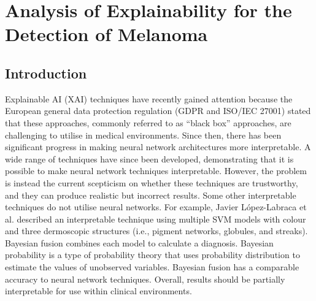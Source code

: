\chapter{Analysis of Explainability for the Detection of Melanoma}

\section{Introduction}
Explainable AI (XAI) techniques have recently gained attention because the European general data protection regulation (GDPR and ISO/IEC 27001) stated that these approaches, commonly referred to as ``black box'' approaches, are challenging to utilise in medical environments. Since then, there has been significant progress in making neural network architectures more interpretable. A wide range of techniques\cite{Fuji2019,  Selvaraju2016, Ribeiro2016} have since been developed, demonstrating that it is possible to make neural network techniques interpretable. However, the problem is instead the current scepticism on whether these techniques are trustworthy\cite{Tjoa2019, Samek2019a}, and they can produce realistic but incorrect results\cite{Ghorbani2019}. Some other interpretable techniques do not utilise neural networks. For example, Javier López-Labraca et al.\cite{Lopez-Labraca2018} described an interpretable technique using multiple SVM models with colour and three dermoscopic structures (i.e., pigment networks, globules, and streaks). Bayesian fusion combines each model to calculate a diagnosis. Bayesian probability is a type of probability theory that uses probability distribution to estimate the values of unobserved variables. Bayesian fusion has a comparable accuracy to neural network techniques\cite{Takruri2017}. Overall, results should be partially interpretable for use within clinical environments.



